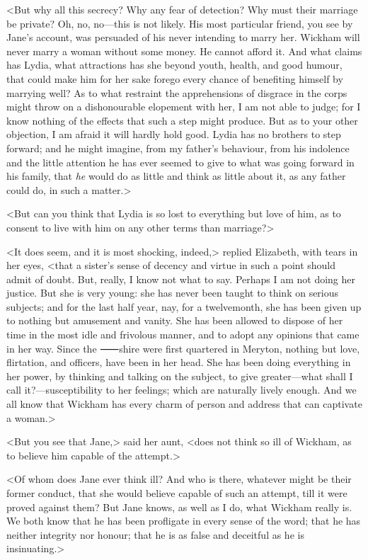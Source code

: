 <But why all this secrecy? Why any fear of detection? Why must their marriage be private? Oh, no, no—this is not likely. His most particular friend, you see by Jane's account, was persuaded of his never intending to marry her. Wickham will never marry a woman without some money. He cannot afford it. And what claims has Lydia, what attractions has she beyond youth, health, and good humour, that could make him for her sake forego every chance of benefiting himself by marrying well? As to what restraint the apprehensions of disgrace in the corps might throw on a dishonourable elopement with her, I am not able to judge; for I know nothing of the effects that such a step might produce. But as to your other objection, I am afraid it will hardly hold good. Lydia has no brothers to step forward; and he might imagine, from my father's behaviour, from his indolence and the little attention he has ever seemed to give to what was going forward in his family, that \textit{he} would do as little and think as little about it, as any father could do, in such a matter.>

<But can you think that Lydia is so lost to everything but love of him, as to consent to live with him on any other terms than marriage?>

<It does seem, and it is most shocking, indeed,> replied Elizabeth, with tears in her eyes, <that a sister's sense of decency and virtue in such a point should admit of doubt. But, really, I know not what to say. Perhaps I am not doing her justice. But she is very young: she has never been taught to think on serious subjects; and for the last half year, nay, for a twelvemonth, she has been given up to nothing but amusement and vanity. She has been allowed to dispose of her time in the most idle and frivolous manner, and to adopt any opinions that came in her way. Since the ⸺shire were first quartered in Meryton, nothing but love, flirtation, and officers, have been in her head. She has been doing everything in her power, by thinking and talking on the subject, to give greater—what shall I call it?—susceptibility to her feelings; which are naturally lively enough. And we all know that Wickham has every charm of person and address that can captivate a woman.>

<But you see that Jane,> said her aunt, <does not think so ill of Wickham, as to believe him capable of the attempt.>

<Of whom does Jane ever think ill? And who is there, whatever might be their former conduct, that she would believe capable of such an attempt, till it were proved against them? But Jane knows, as well as I do, what Wickham really is. We both know that he has been profligate in every sense of the word; that he has neither integrity nor honour; that he is as false and deceitful as he is insinuating.>


